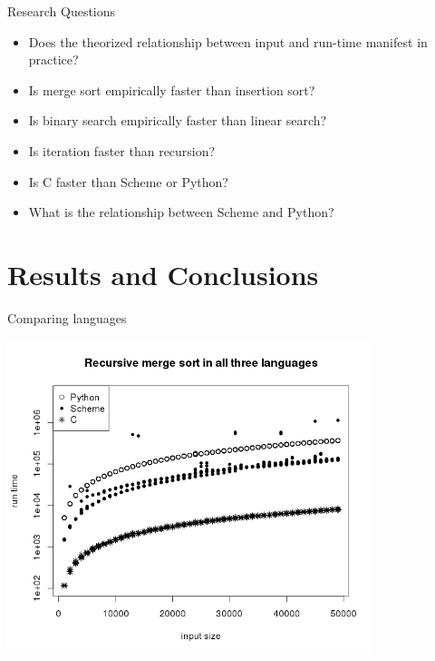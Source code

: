\documentclass[]{beamer}
\begin{document}
\begin{frame}[t]{Research Questions}
\begin{itemize}
	\item Does the theorized relationship between input and run-time manifest in practice?
    \item Is merge sort empirically faster than insertion sort?
    \item Is binary search empirically faster than linear search?
    \item Is iteration faster than recursion?
    \item Is C faster than Scheme or Python?
    \item What is the relationship between Scheme and Python?
\end{itemize}

\end{frame}

\section{Results and Conclusions}

\begin{frame}{Comparing languages}
\begin{center}
	\includegraphics[width=0.8\textwidth]{plots/recursive_merge_in_all_three_lgs.png}
\end{center}
\end{frame}
\end{document}

